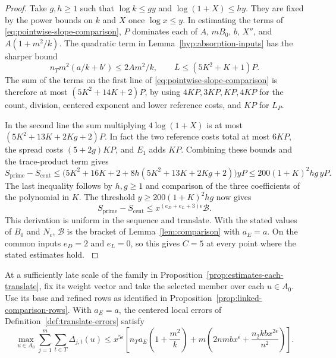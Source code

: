 \begin{proof}
Take \(g,h\ge1\) such that \(\log k\le gy\) and
\(\log(1+X)\le hy\). They are fixed by the power bounds
on \(k\) and \(X\) once \(\log x\le y\). In estimating the
terms of \eqref{eq:pointwise-slope-comparison}, \(P\)
dominates each of \(A\), \(mB_0\), \(b\), \(X''\), and
\(A(1+m^2/k)\). The quadratic term in Lemma~\ref{hyp:absorption-inputs}
has the sharper bound
\[
 n_Tm^2(a/k+b')\le2Am^2/k,\qquad
 \overline L\le(5K^2+K+1)P .
\] The sum of the terms on
the first line of \eqref{eq:pointwise-slope-comparison}
is therefore at most \((5K^2+14K+2)P\), by using
\(4KP,3KP,KP,4KP\) for the count, division, centered
exponent and lower reference costs, and \(KP\) for \(L_P\).

In the second line the sum multiplying \(4\log(1+X)\)
is at most \((5K^2+13K+2Kg+2)P\). In fact the two
reference costs total at most \(6KP\), the spread costs
\((5+2g)KP\), and \(E_1\) adds \(KP\).
Combining these bounds and the trace-product term gives
\[
 S_{\mathrm{prime}}-S_{\mathrm{cent}}
 \le \big(5K^2+16K+2+8h(5K^2+13K+2Kg+2)\big)yP
 \le 200(1+K)^2 hg\,yP.
\]
The last inequality follows by \(h,g\ge1\) and comparison
of the three coefficients of the polynomial in \(K\).
The threshold \(y\ge200(1+K)^2 hg\) now gives
\[
 S_{\mathrm{prime}}-S_{\mathrm{cent}}
 \le x^{(e_D+e_L+3)\epsilon}\mathcal B.
\]
This derivation is uniform in the sequence and translate.
With the stated values of \(B_0\) and \(N_c\),
\(\mathcal B\) is the bracket of
Lemma~\ref{lem:comparison} with \(a_E=a\).
On the common inputs \(e_D=2\) and \(e_L=0\), so this
gives \(C=5\) at every point where the stated estimates
hold. \label{cor:frames-12}

\end{proof}

\begin{corollary}\label{cor:raw-gap-completed-scale}
At a sufficiently late scale of the family in Proposition~\ref{prop:estimates-each-translate},
fix its weight vector and take the selected member over each \(u\in A_0\).
Use its base and refined rows as identified in
Proposition~\ref{prop:linked-comparison-rows}. With \(a_E=a\), the centered local errors of Definition~\ref{def:translate-errors} satisfy
\[
 \max_{u\in A_0}\sum_{j=1}^m\sum_{t\in T}\Delta_{j,t}(u)
 \le x^{5\epsilon}\!
 \left[n_Ta_E\left(1+\frac{m^2}{k}\right)
      +m\left(2nmbx^\epsilon+\frac{n_2kb x^{2\epsilon}}{n^2}\right)\right].
\]
\end{corollary}

